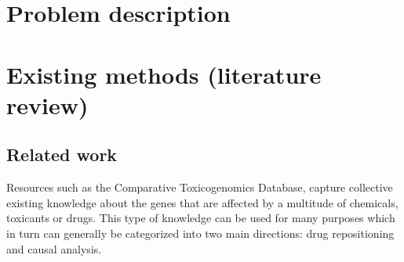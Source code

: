 \section{Problem description}

\section{Existing methods (literature review)}
\subsection{Related work}

Resources such as the Comparative Toxicogenomics Database, capture collective existing knowledge about the genes that are affected by a multitude of  chemicals, toxicants or drugs. This type of knowledge can be used for many purposes which in turn can generally be categorized into two main directions: drug repositioning and causal analysis.

